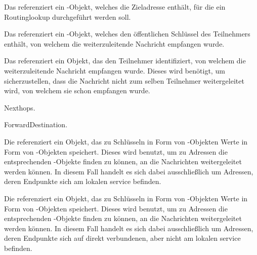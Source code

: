 \begin{description}

		Das \javaarg {} referenziert ein -Objekt,
		welches die Zieladresse enthält, für die ein Routinglookup durchgeführt werden soll.

		Das \javaarg {} referenziert ein -Objekt, welches
		den öffentlichen Schlüssel des Teilnehmers enthält, von welchem die weiterzuleitende
		Nachricht empfangen wurde.

		Das \javaarg {} referenziert ein Objekt, das den Teilnehmer
		identifiziert, von welchem die weiterzuleitende Nachricht empfangen wurde. Dieses wird
		benötigt, um sicherzustellen, dass die Nachricht nicht zum selben Teilnehmer
		weitergeleitet wird, von welchem sie schon empfangen wurde.

		\glsdesc{Nexthops}.

		\glsdesc{ForwardDestination}.

		Die \javainstvar {} referenziert ein Objekt, das zu Schlüsseln
		in Form von -Objekten Werte in Form von -Objekten
		speichert. Dieses wird benutzt, um zu Adressen die entsprechenden
		-Objekte finden zu können, an die Nachrichten weitergeleitet werden
		können. In diesem Fall handelt es sich dabei ausschließlich um Adressen, deren Endpunkte
		sich am lokalen \gls{service} befinden.

		Die \javainstvar {} referenziert ein Objekt, das zu Schlüsseln
		in Form von -Objekten Werte in Form von -Objekten
		speichert. Dieses wird benutzt, um zu Adressen die entsprechenden
		-Objekte finden zu können, an die Nachrichten weitergeleitet werden
		können. In diesem Fall handelt es sich dabei ausschließlich um Adressen, deren Endpunkte
		sich auf direkt verbundenen, aber nicht am lokalen \gls{service} befinden.

\end{description}

